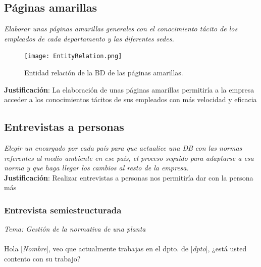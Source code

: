 \documentclass[a4paper]{article}
\begin{document}
\subsection{Páginas amarillas}
\label{sec:pAmarilla}
\textit{Elaborar unas páginas amarillas generales con el conocimiento tácito de los empleados de cada departamento y las diferentes sedes.}

\begin{figure}[ht!]
	\texttt{[image: EntityRelation.png]}
	\caption{Entidad relación de la BD de las páginas amarillas.}
	\label{fig:entiy relation}
\end{figure}

\textbf{Justificación}: La elaboración de unas páginas amarillas permitiría a la empresa acceder a los conocimientos tácitos de sus empleados con más velocidad y eficacia

\subsection{Entrevistas a personas}
\label{sec:entrevistas}
\textit{Elegir un encargado por cada país para que actualice una DB con las normas referentes al medio ambiente en ese país, el proceso seguido para adaptarse a esa norma y que haga llegar los cambios al resto de la empresa.}
\\

\textbf{Justificación}: Realizar entrevistas a personas nos permitiría dar con la persona más 

\subsubsection{Entrevista semiestructurada}
\textit{Tema: Gestión de la normativa de una planta}\\\\
Hola [\textit{Nombre}], veo que actualmente trabajas en el dpto. de [\textit{dpto}], ¿está usted contento con su trabajo?
\end{document}
